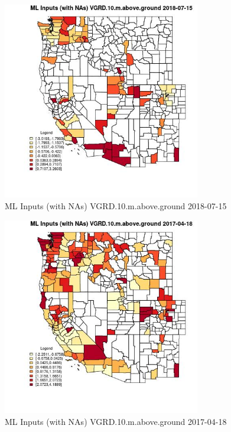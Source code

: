 \begin{figure} 
\centering  
\includegraphics[width=0.77\textwidth]{Code_Outputs/Report_ML_input_PM25_Step4_part_e_de_duplicated_aves_compiled_2019-05-21wNAs_CountyVGRD10mabovegroundMean2018-07-15.jpg} 
\caption{\label{fig:Report_ML_input_PM25_Step4_part_e_de_duplicated_aves_compiled_2019-05-21wNAsCountyVGRD10mabovegroundMean2018-07-15}ML Inputs (with NAs) VGRD.10.m.above.ground 2018-07-15} 
\end{figure} 
 

\begin{figure} 
\centering  
\includegraphics[width=0.77\textwidth]{Code_Outputs/Report_ML_input_PM25_Step4_part_e_de_duplicated_aves_compiled_2019-05-21wNAs_CountyVGRD10mabovegroundMean2017-04-18.jpg} 
\caption{\label{fig:Report_ML_input_PM25_Step4_part_e_de_duplicated_aves_compiled_2019-05-21wNAsCountyVGRD10mabovegroundMean2017-04-18}ML Inputs (with NAs) VGRD.10.m.above.ground 2017-04-18} 
\end{figure} 
 


